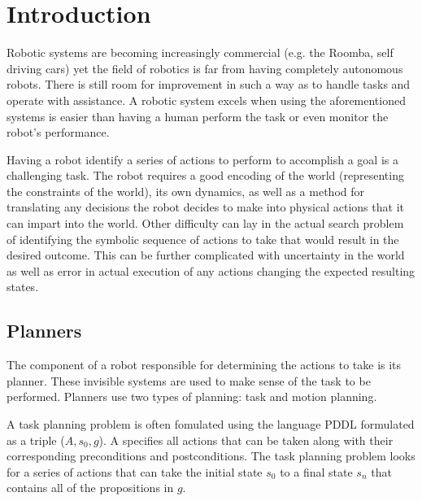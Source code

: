 \chapter{Introduction} \label{intro}
Robotic systems are becoming increasingly commercial (e.g. the Roomba, self driving cars) yet the field of robotics is far from having completely autonomous robots. There is still room for improvement in such a way as to handle tasks and operate with assistance. A robotic system excels when using the aforementioned systems is easier than having a human perform the task or even monitor the robot's performance.

Having a robot identify a series of actions to perform to accomplish a goal is a challenging task. The robot requires a good encoding of the world (representing the constraints of the world), its own dynamics, as well as a method for translating any decisions the robot decides to make into physical actions that it can impart into the world. Other difficulty can lay in the actual search problem of identifying the symbolic sequence of actions to take that would result in the desired outcome. This can be further complicated with uncertainty in the world as well as error in actual execution of any actions changing the expected resulting states.

\section{Planners} \label{intro:planners}
The component of a robot responsible for determining the actions to take is its planner. These invisible systems are used to make sense of the task to be performed. Planners use two types of planning: task and motion planning. 

A task planning problem is often fomulated using the language PDDL  formulated as a triple ($A, s_0, g$). A specifies all actions that can be taken along with their corresponding preconditions and postconditions. The task planning problem looks for a series of actions that can take the initial state $s_0$ to a final state $s_{n}$ that contains all of the propositions in $g$. 

